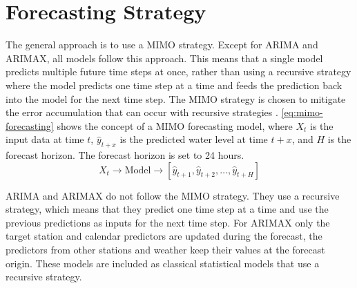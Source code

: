 \section{Forecasting Strategy}
The general approach is to use a \ac{MIMO} strategy. Except for \ac{ARIMA} and \ac{ARIMAX}, all models follow this approach. This means that a single model predicts multiple future time steps at once, rather than using a recursive strategy where the model predicts one time step at a time and feeds the prediction back into the model for the next time step. The \ac{MIMO} strategy is chosen to mitigate the error accumulation that can occur with recursive strategies \cite{bentaiebReviewComparisonStrategies2012}. \autoref{eq:mimo-forecasting} shows the concept of a \ac{MIMO} forecasting model, where $X_t$ is the input data at time $t$, $\hat{y}_{t+x}$ is the predicted water level at time $t+x$, and $H$ is the forecast horizon. The forecast horizon is set to 24 hours.
\begin{equation}
  X_t \longrightarrow \text{Model} \longrightarrow [\hat{y}_{t+1}, \hat{y}_{t+2}, \ldots, \hat{y}_{t+H}]
  \label{eq:mimo-forecasting}
\end{equation}

\ac{ARIMA} and \ac{ARIMAX} do not follow the \ac{MIMO} strategy. They use a recursive strategy, which means that they predict one time step at a time and use the previous predictions as inputs for the next time step. For \ac{ARIMAX} only the target station and calendar predictors are updated during the forecast, the predictors from other stations and weather keep their values at the forecast origin. These models are included as classical statistical models that use a recursive strategy.



